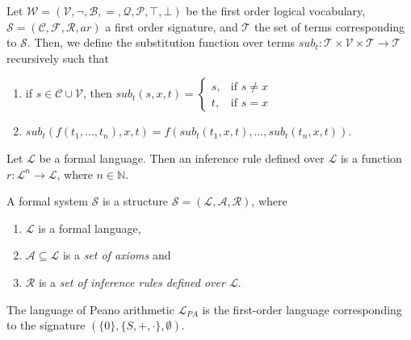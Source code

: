 \begin{definition}\label{def:sub-term}
    Let $\mathcal{W} = (\mathcal{V},\neg,\mathcal{B},=,\mathcal{Q},\mathcal{P}, \top, \bot)$ be the first order logical vocabulary, $\mathcal{S} = (\mathcal{C},\mathcal{F},\mathcal{R},ar)$ a first order signature, and $\mathcal{T}$ the set of terms corresponding to $\mathcal{S}$. Then, we define the substitution function over terms $sub_t : \mathcal{T} \times \mathcal{V} \times \mathcal{T} \to \mathcal{T}$ recursively such that
    \begin{enumerate}
        \item if $s \in \mathcal{C}\cup \mathcal{V}$, then $sub_t(s,x,t) = \begin{cases}
                        s, &\text{if }s \not = x \\
                        t, &\text{if }s = x
                        \end{cases}$
        \item $sub_t(f(t_1,...,t_n),x,t) = f(sub_t(t_1,x,t),...,sub_t(t_n,x,t))$.
    \end{enumerate}
\end{definition}

\begin{definition}\label{def:inf-rule}
    Let $\mathcal{L}$ be a formal language. Then an inference rule defined over $\mathcal{L}$ is a function $r : \mathcal{L}^n \to \mathcal{L}$, where $n \in \mathbb{N}$.
\end{definition}

\begin{definition}\label{def:formal-system}
    A formal system $\mathcal{S}$ is a structure $\mathcal{S} = (\mathcal{L}, \mathcal{A}, \mathcal{R})$, where 
    \begin{enumerate}
        \item $\mathcal{L}$ is a formal language,
        \item $\mathcal{A} \subseteq \mathcal{L}$ is a \textit{set of axioms} and 
        \item $\mathcal{R}$ is a \textit{set of inference rules defined over $\mathcal{L}$}.
    \end{enumerate}
\end{definition}

\begin{definition}\label{def:LPA}
    The language of Peano arithmetic $\mathcal{L}_{PA}$ is the first-order language corresponding to the signature $(\{0\},\{S,+,\cdot\},\emptyset)$.
\end{definition} 

